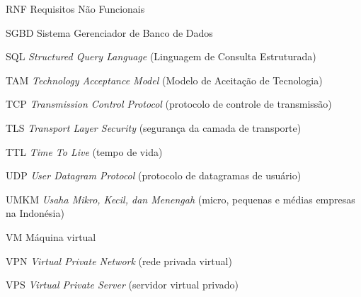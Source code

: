 \begin{siglas}
    \item[RNF] Requisitos Não Funcionais
    \item[SGBD] Sistema Gerenciador de Banco de Dados
    \item[SQL] \textit{Structured Query Language} (Linguagem de Consulta Estruturada)
    \item[TAM] \textit{Technology Acceptance Model} (Modelo de Aceitação de Tecnologia)
    \item[TCP] \textit{Transmission Control Protocol} (protocolo de controle de transmissão)
    \item[TLS] \textit{Transport Layer Security} (segurança da camada de transporte)
    \item[TTL] \textit{Time To Live} (tempo de vida)
    \item[UDP] \textit{User Datagram Protocol} (protocolo de datagramas de usuário)
    \item[UMKM] \textit{Usaha Mikro, Kecil, dan Menengah} (micro, pequenas e médias empresas na Indonésia)
    \item[VM] Máquina virtual
    \item[VPN] \textit{Virtual Private Network} (rede privada virtual)
    \item[VPS] \textit{Virtual Private Server} (servidor virtual privado)
\end{siglas}
